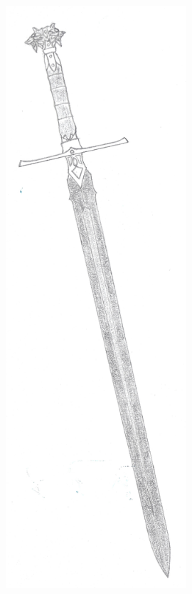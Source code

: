 \begin{figure}[b]
\begin{minipage}{0.3\linewidth}
    \end{minipage}
    \begin{minipage}{0.3\linewidth}
    \centering
    \includegraphics[width=0.6\textwidth]{illustrations/irian_endurium.jpg}
    \end{minipage}
\end{figure}

\newpage
\FloatBarrier




